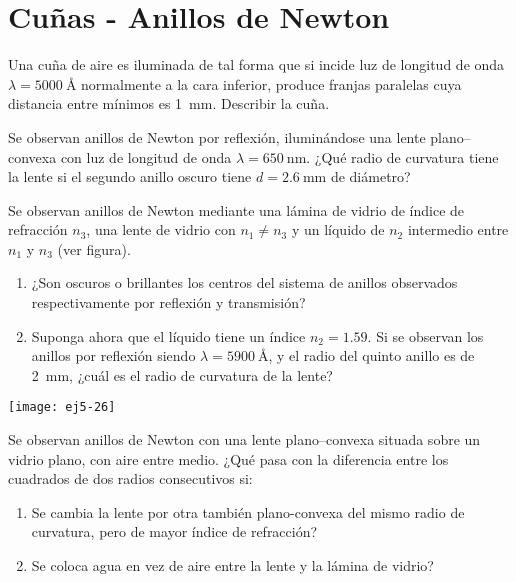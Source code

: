 \section*{Cuñas - Anillos de Newton}

\item Una cuña de aire es iluminada de tal forma que si incide luz de longitud de onda \(\lambda = \SI{5000}{\angstrom}\) normalmente a la cara inferior, produce
franjas paralelas cuya distancia entre mínimos es \SI{1}{\milli\metre}.
Describir la cuña. 


\item Se observan anillos de Newton por reflexión, iluminándose una lente plano--convexa con luz de longitud de onda \(\lambda = \SI{650}{\nano\metre}\).
¿Qué radio de curvatura tiene la lente si el segundo anillo oscuro tiene \(d = \SI{2.6}{\milli\metre}\) de diámetro? 



\item
\begin{minipage}[t][4.3cm]{0.7\textwidth}
Se observan anillos de Newton mediante una lámina de vidrio de índice de refracción $n_3$, una lente de vidrio con $n_1 \ne n_3$ y un líquido de $n_2$ intermedio entre $n_1$ y $n_3$ (ver figura). 
\begin{enumerate}
\item ¿Son oscuros o brillantes los centros del sistema de anillos observados respectivamente por reflexión y transmisión? 
\item Suponga ahora que el líquido tiene un índice $n_2 = \num{1.59}$.
Si se observan los anillos por reflexión siendo $\lambda = \SI{5900}{\angstrom}$, y el radio del quinto anillo es de \SI{2}{\milli\metre}, ¿cuál es el radio de curvatura
de la lente?
\end{enumerate}
\end{minipage}
\begin{minipage}[c][0cm][t]{0.25\textwidth}
	\texttt{[image: ej5-26]}
\end{minipage}



\item Se observan anillos de Newton con una lente plano--convexa situada sobre un vidrio plano, con aire entre medio.
¿Qué pasa con la diferencia entre los cuadrados de dos radios consecutivos si: 
\begin{enumerate}
	\item Se cambia la lente por otra también plano-convexa del mismo radio de curvatura, pero de mayor índice de refracción? 
	\item Se coloca agua en vez de aire entre la lente y la lámina de vidrio? 
\end{enumerate}



